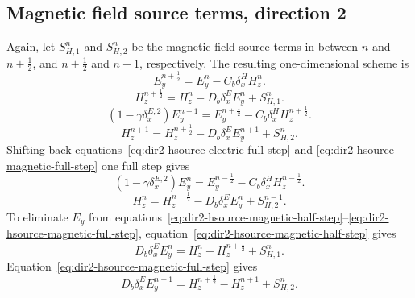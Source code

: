 \documentclass{article}
\numberwithin{figure}{section}
\begin{document}
\subsection{Magnetic field source terms, direction 2}

Again, let $S_{H,1}^n$ and $S_{H,2}^n$ be the magnetic field source terms in between $n$ and $n+\frac{1}{2}$, and $n+\frac{1}{2}$ and $n+1$, respectively. The resulting one-dimensional scheme is
\begin{equation}
    E_y^{n+\frac{1}{2}}=E_y^n-C_b\delta_x^H H_z^n. \label{eq:dir2-hsource-electric-half-step}
\end{equation}
\begin{equation}
    H_z^{n+\frac{1}{2}}=H_z^n-D_b\delta_x^E E_y^n+S_{H,1}^n. \label{eq:dir2-hsource-magnetic-half-step}
\end{equation}
\begin{equation}
    \left(1-\gamma\delta_x^{E,2}\right)E_y^{n+1}=E_y^{n+\frac{1}{2}}-C_b\delta_x^H H_z^{n+\frac{1}{2}}. \label{eq:dir2-hsource-electric-full-step}
\end{equation}
\begin{equation}
    H_z^{n+1}=H_z^{n+\frac{1}{2}}-D_b\delta_x^E E_y^{n+1}+S_{H,2}^n. \label{eq:dir2-hsource-magnetic-full-step}
\end{equation}
Shifting back equations~\eqref{eq:dir2-hsource-electric-full-step} and \eqref{eq:dir2-hsource-magnetic-full-step} one full step gives
\begin{equation}
    \left(1-\gamma\delta_x^{E,2}\right)E_y^n=E_y^{n-\frac{1}{2}}-C_b\delta_x^H H_z^{n-\frac{1}{2}}. \label{eq:dir2-hsource-shifted-electric-step}
\end{equation}
\begin{equation}
    H_z^n=H_z^{n-\frac{1}{2}}-D_b\delta_x^E E_y^n+S_{H,2}^{n-1}. \label{eq:dir2-hsource-shifted-magnetic-step}
\end{equation}
To eliminate $E_y$ from equations~\eqref{eq:dir2-hsource-magnetic-half-step}--\eqref{eq:dir2-hsource-magnetic-full-step}, equation~\eqref{eq:dir2-hsource-magnetic-half-step} gives
\begin{equation}
    D_b\delta_x^E E_y^n=H_z^n-H_z^{n+\frac{1}{2}}+S_{H,1}^n. \label{eq:dir2-hsource-e-elimination-identity}
\end{equation}
Equation~\eqref{eq:dir2-hsource-magnetic-full-step} gives
\begin{equation}
    D_b\delta_x^E E_y^{n+1}=H_z^{n+\frac{1}{2}}-H_z^{n+1}+S_{H,2}^n. \label{eq:dir2-hsource-e-n1-elimination-identity}
\end{equation}
\end{document}
